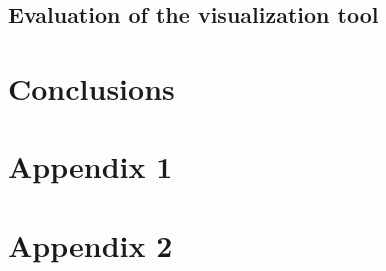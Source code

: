 \documentclass[english, 12pt, a4paper, sci, utf8, a-1b, online]{aaltothesis}
\begin{document}

\subsection{Evaluation of the visualization tool}


\clearpage
\section{Conclusions}




\clearpage
\thesisbibliography




\clearpage
\thesisappendix

\section{Appendix 1}

\clearpage
\section{Appendix 2}

\clearpage
\end{document}
